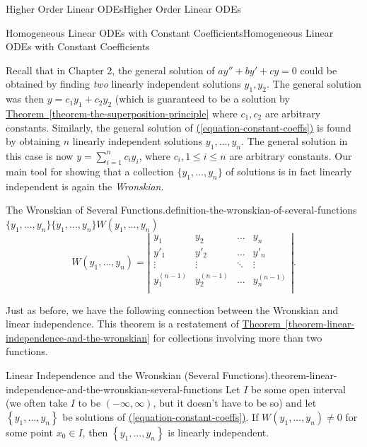 \documentclass[10pt,]{book}
\numberwithin{equation}{section}
\newcommand{\set}[1]{\left\{ #1 \right\}}
\newcommand{\amp}{&}
\begin{document}
\begin{chapterptx}{Higher Order Linear ODEs}{}{Higher Order Linear ODEs}{}{}
\begin{sectionptx}{Homogeneous Linear ODEs with Constant Coefficients}{}{Homogeneous Linear ODEs with Constant Coefficients}{}{}
\par
\hypertarget{p-261}{}%
Recall that in Chapter 2, the general solution of \(ay''+by'+cy=0\) could be obtained by finding \emph{two} linearly independent solutions \(y_{1},y_{2}\). The general solution was then \(y = c_{1}y_{1}+c_{2}y_{2}\) (which is guaranteed to be a solution by \hyperref[theorem-the-superposition-principle]{Theorem~\ref{theorem-the-superposition-principle}} where \(c_{1},c_{2}\) are arbitrary constants. Similarly, the general solution of \hyperref[equation-constant-coeffs]{(\ref{equation-constant-coeffs})} is found by obtaining \(n\) linearly independent solutions \(y_{1},\dots,y_{n}\). The general solution in this case is now \(y = \sum_{i=1}^{n}c_{i}y_{i}\), where \(c_{i},1\leq i\leq n\) are arbitrary constants. Our main tool for showing that a collection \(\{y_{1},\dots,y_{n}\}\) of solutions is in fact linearly independent is again the \emph{Wronskian}.%
\begin{definition}{The Wronskian of Several Functions.}{definition-the-wronskian-of-several-functions}%
\(\{y_{1},\dots,y_{n}\}\)\(\{y_{1},\dots,y_{n}\}\)\(W(y_{1},\dots,y_{n})\)%
\begin{equation*}
W(y_{1},\dots,y_{n}) = \left|\begin{array}{cccc}
y_{1} \amp y_{2} \amp \dots   \amp y_{n}   \\
y'_{1}  \amp y'_{2}  \amp \dots   \amp y'_{n}  \\
\vdots  \amp \vdots  \amp \ddots  \amp \vdots  \\
y^{(n-1)}_{1} \amp y^{(n-1)}_{2} \amp \dots   \amp y^{(n-1)}_{n} \\
\end{array}\right|.
\end{equation*}
\end{definition}
\hypertarget{p-262}{}%
Just as before, we have the following connection between the Wronskian and linear independence. This theorem is a restatement of \hyperref[theorem-linear-independence-and-the-wronskian]{Theorem~\ref{theorem-linear-independence-and-the-wronskian}} for collections involving more than two functions.%
\begin{theorem}{Linear Independence and the Wronskian (Several Functions).}{}{theorem-linear-independence-and-the-wronskian-several-functions}%
\hypertarget{p-263}{}%
Let \(I\) be some open interval (we often take \(I\) to be \((-\infty,\infty)\), but it doesn't have to be so) and let \(\set{y_{1},\dots,y_{n}}\) be solutions of \hyperref[equation-constant-coeffs]{(\ref{equation-constant-coeffs})}. If \(W(y_{1},\dots,y_{n})\neq0\) for some point \(x_{0}\in I\), then \(\set{y_{1},\dots,y_{n}}\) is linearly independent.%

\end{theorem}
\end{sectionptx}
\end{chapterptx}
\end{document}
